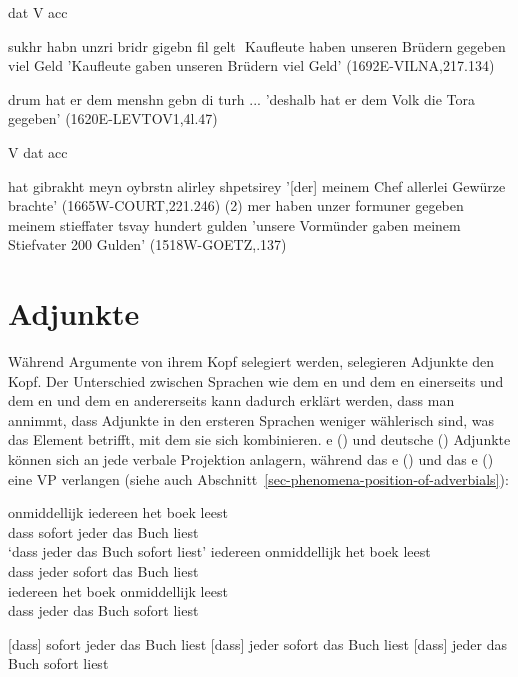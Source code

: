 dat V acc

sukhr habn unzri bridr gigebn fil gelt  
Kaufleute haben unseren Brüdern gegeben viel Geld
'Kaufleute gaben unseren Brüdern viel Geld'
(1692E-VILNA,217.134)

drum hat er dem menshn gebn di turh ... 
'deshalb hat er dem Volk die Tora gegeben'
(1620E-LEVTOV1,4l.47)

V dat acc

hat gibrakht meyn oybrstn alirley shpetsirey '[der] meinem Chef allerlei Gewürze brachte'
(1665W-COURT,221.246)
(2) mer haben unzer formuner gegeben meinem stieffater tsvay hundert gulden
'unsere Vormünder gaben meinem Stiefvater 200 Gulden' (1518W-GOETZ,.137)

\fi

\section{Adjunkte}
\label{sec-adjuncts}

Während Argumente von ihrem Kopf selegiert werden, selegieren Adjunkte den Kopf. Der Unterschied zwischen
Sprachen wie dem en und dem en einerseits und dem en und dem en andererseits kann
dadurch erklärt werden, dass man annimmt, dass Adjunkte in den ersteren Sprachen weniger wählerisch sind, was das Element
betrifft, mit dem sie sich kombinieren. e () und deutsche ()
Adjunkte können sich an jede verbale Projektion anlagern, während das e () und das e () eine
VP verlangen (siehe auch Abschnitt~\ref{sec-phenomena-position-of-adverbials}):

\eal
\ex
\gll [dat] onmiddellijk iedereen het boek leest\\
     \spacebr{}dass sofort jeder das Buch liest\\\dutch
\glt `dass jeder das Buch sofort liest'
\ex
\gll [dat] iedereen onmiddellijk het boek leest\\
     \spacebr{}dass jeder sofort das Buch liest\\
\ex
\gll [dat] iedereen het boek onmiddellijk leest\\
    \spacebr{}dass jeder das Buch sofort liest\\
\zl

\eal
\ex
\label{ex-m-j-b-l}
{}[dass] sofort jeder das Buch liest
\ex
\label{ex-j-m-b-l}
{}[dass] jeder sofort das Buch liest
\ex
\label{ex-j-b-m-l}
{}[dass] jeder das Buch sofort liest
\zl

